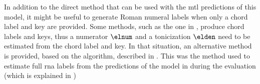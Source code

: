 
In addition to the direct method that can be used with the
\gls{mtl} predictions of this model, it might be useful to
generate Roman numeral labels when only a chord label and
key are provided. Some methods, such as the one in
\textcite{mcleod2021modular}, produce chord labels and keys,
thus a numerator $\elnum$ and a tonicization $\elden$ need
to be estimated from the chord label and key. In that
situation, an alternative method is provided, based on the
\algorithmrn{} algorithm, described in
.
This was the method used to estimate full \gls{rna} labels
from the predictions of the model in
\textcite{mcleod2021modular, chen2021attend} during the
evaluation (which is explained in
)

